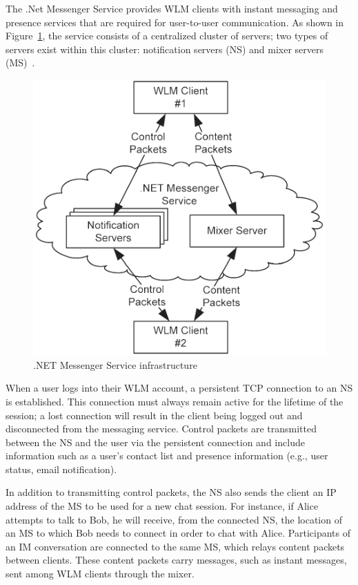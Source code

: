 \documentclass{sig-alternate}
\begin{document}
The .Net Messenger Service provides WLM clients with instant messaging and presence services that are required for user-to-user communication.
As shown in Figure~\ref{fig:wlminfrastructure}, the service consists of a centralized cluster of servers; two types of servers exist within this cluster: notification servers (NS) and mixer servers (MS)~\cite{torre:wlm}.

\begin{figure}[h]
	\centering
	\caption{.NET Messenger Service infrastructure}
	\label{fig:wlminfrastructure}
	\includegraphics{graphics/infrastructure}
\end{figure}

When a user logs into their WLM account, a persistent TCP connection to an NS is established.
This connection must always remain active for the lifetime of the session; a lost connection will result in the client being logged out and disconnected from the messaging service.
Control packets are transmitted between the NS and the user via the persistent connection and include information such as a user's contact list and presence information (e.g., user status, email notification).

In addition to transmitting control packets, the NS also sends the client an IP address of the MS to be used for a new chat session.
For instance, if Alice attempts to talk to Bob, he will receive, from the connected NS, the location of an MS to which Bob needs to connect in order to chat with Alice.
Participants of an IM conversation are connected to the same MS, which relays content packets between clients.
These content packets carry messages, such as instant messages, sent among WLM clients through the mixer.
\end{document}

